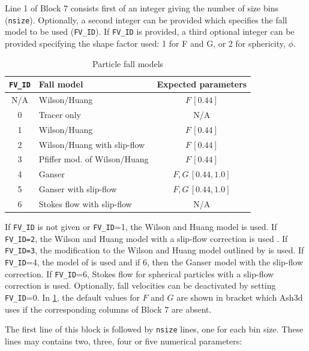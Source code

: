 Line 1 of Block 7 consists first of an integer giving the number of size bins
(\texttt{nsize}).
Optionally, a second integer can be provided which specifies the fall model to be used
(\texttt{FV\_ID}).
If \texttt{FV\_ID} is provided, a third optional integer can be provided specifying
the shape factor used: 1 for F and G, or 2 for sphericity, $\phi$.
\begin{table}[htbp]
\begin{center}
\begin{tabular}{| c | l | c | }
\hline
\texttt{FV\_ID} & Fall model & Expected parameters\\
\hline
N/A & Wilson/Huang & $F \,[0.44]$ \\
0 &  Tracer only & N/A \\
1 &  Wilson/Huang & $F\, [0.44]$ \\
2 &  Wilson/Huang with slip-flow & $F\, [0.44]$ \\
3 &  Pfiffer mod. of Wilson/Huang & $F\, [0.44]$ \\
4 &  Ganser & $F,G \,[0.44,1.0]$ \\
5 &  Ganser with slip-flow & $F,G \,[0.44,1.0]$ \\
6 &  Stokes flow with slip-flow & N/A \\
\hline
\end{tabular}
\caption{\label{tab:FallModelOpt}Particle fall models}
\end{center}
\end{table}

If \texttt{FV\_ID} is not given or \texttt{FV\_ID}=1, the Wilson and Huang \cite{Wilson79}
model is used.
If \texttt{FV\_ID=2}, the Wilson and Huang model with a slip-flow correction is used \cite{Seinfeld06}.
If \texttt{FV\_ID=3}, the modification to the Wilson and Huang model outlined
by \cite{Pfeiffer05} is used. If \texttt{FV\_ID}=4, the model of \cite{Ganser93} is used
and if 6, then the Ganser model with the slip-flow correction. If
\texttt{FV\_ID}=6, Stokes flow for spherical particles with a slip-flow correction is used.
Optionally, fall velocities can be deactivated by setting \texttt{FV\_ID}=0.  In \ref{tab:FallModelOpt},
the default values for $F$ and $G$ are shown in bracket which Ash3d uses if the corresponding
columns of Block 7 are absent.

The first line of this block is followed by \texttt{nsize} lines, one for each bin size.
These lines may contains two, three, four or five numerical parameters:

